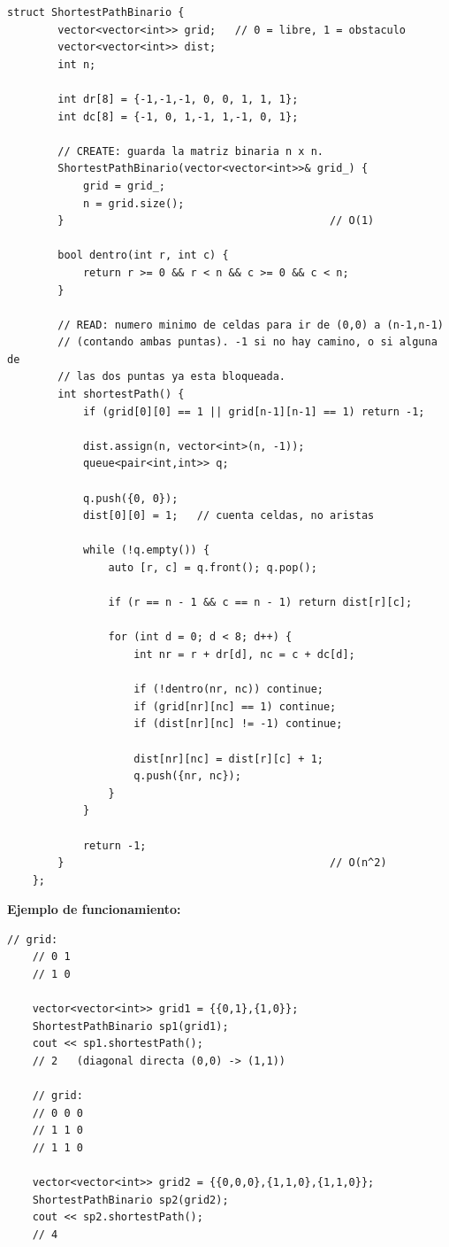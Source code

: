 \documentclass[10pt,a4paper,twocolumn]{article}
\begin{document}
\begin{lstlisting}[style=cpp]
	struct ShortestPathBinario {
		vector<vector<int>> grid;   // 0 = libre, 1 = obstaculo
		vector<vector<int>> dist;
		int n;
		
		int dr[8] = {-1,-1,-1, 0, 0, 1, 1, 1};
		int dc[8] = {-1, 0, 1,-1, 1,-1, 0, 1};
		
		// CREATE: guarda la matriz binaria n x n.
		ShortestPathBinario(vector<vector<int>>& grid_) {
			grid = grid_;
			n = grid.size();
		}                                          // O(1)
		
		bool dentro(int r, int c) {
			return r >= 0 && r < n && c >= 0 && c < n;
		}
		
		// READ: numero minimo de celdas para ir de (0,0) a (n-1,n-1)
		// (contando ambas puntas). -1 si no hay camino, o si alguna de
		// las dos puntas ya esta bloqueada.
		int shortestPath() {
			if (grid[0][0] == 1 || grid[n-1][n-1] == 1) return -1;
			
			dist.assign(n, vector<int>(n, -1));
			queue<pair<int,int>> q;
			
			q.push({0, 0});
			dist[0][0] = 1;   // cuenta celdas, no aristas
			
			while (!q.empty()) {
				auto [r, c] = q.front(); q.pop();
				
				if (r == n - 1 && c == n - 1) return dist[r][c];
				
				for (int d = 0; d < 8; d++) {
					int nr = r + dr[d], nc = c + dc[d];
					
					if (!dentro(nr, nc)) continue;
					if (grid[nr][nc] == 1) continue;
					if (dist[nr][nc] != -1) continue;
					
					dist[nr][nc] = dist[r][c] + 1;
					q.push({nr, nc});
				}
			}
			
			return -1;
		}                                          // O(n^2)
	};
\end{lstlisting}

\textbf{Ejemplo de funcionamiento:}

\begin{lstlisting}[style=cpp]
	// grid:
	// 0 1
	// 1 0
	
	vector<vector<int>> grid1 = {{0,1},{1,0}};
	ShortestPathBinario sp1(grid1);
	cout << sp1.shortestPath();
	// 2   (diagonal directa (0,0) -> (1,1))
	
	// grid:
	// 0 0 0
	// 1 1 0
	// 1 1 0
	
	vector<vector<int>> grid2 = {{0,0,0},{1,1,0},{1,1,0}};
	ShortestPathBinario sp2(grid2);
	cout << sp2.shortestPath();
	// 4
\end{lstlisting}
\end{document}
